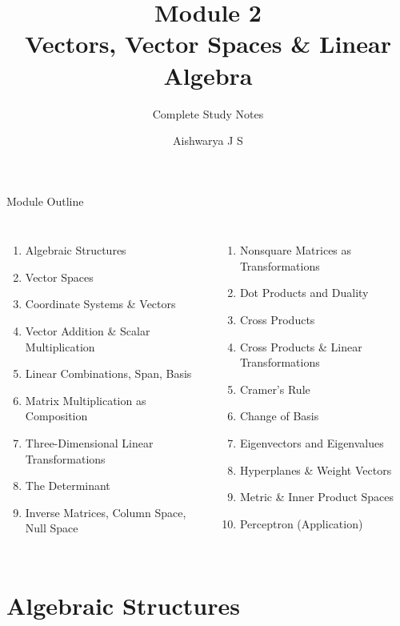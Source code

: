 \documentclass[9pt,aspectratio=169]{beamer}
\title[Module 2: Linear Algebra \& Vector Spaces]{Module 2\\ Vectors, Vector Spaces \& Linear Algebra}
\subtitle{Complete Study Notes}
\author{Aishwarya J S}
\institute{M.Tech CSE (AI \& Data Science)}
\date{}
\begin{document}
\begin{frame}
\titlepage
\end{frame}

\begin{frame}{Module Outline}
\begin{columns}[t]
\begin{enumerate}
\footnotesize
\item Algebraic Structures
\item Vector Spaces
\item Coordinate Systems \& Vectors
\item Vector Addition \& Scalar Multiplication
\item Linear Combinations, Span, Basis
\item Matrix Multiplication as Composition
\item Three-Dimensional Linear Transformations
\item The Determinant
\item Inverse Matrices, Column Space, Null Space
\end{enumerate}
\begin{enumerate}
\footnotesize
\setcounter{enumi}{9}
\item Nonsquare Matrices as Transformations
\item Dot Products and Duality
\item Cross Products
\item Cross Products \& Linear Transformations
\item Cramer's Rule
\item Change of Basis
\item Eigenvectors and Eigenvalues
\item Hyperplanes \& Weight Vectors
\item Metric \& Inner Product Spaces
\item Perceptron (Application)
\end{enumerate}
\end{columns}
\end{frame}

\section{Algebraic Structures}
\end{document}
